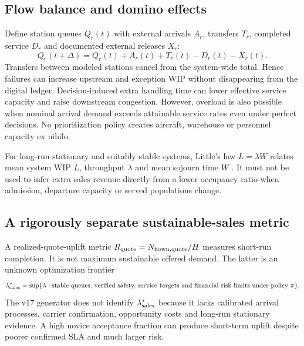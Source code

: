 \documentclass[10pt,a4paper]{article}
\theoremstyle{definition}\newtheorem{definition}[theorem]{Definition}
\theoremstyle{remark}\newtheorem{remark}[theorem]{Remark}
\newcommand{\1}{\mathbbm 1}
\begin{document}
\subsection{Flow balance and domino effects}
Define station queues $Q_r(t)$ with external arrivals $A_r$, transfers $T_r$, completed service $D_r$ and documented external releases $X_r$:
\begin{equation}\label{eq:queue}Q_r(t+\Delta)=Q_r(t)+A_r(t)+T_r(t)-D_r(t)-X_r(t).\end{equation}
Transfers between modeled stations cancel from the system-wide total. Hence failures can increase upstream and exception WIP without disappearing from the digital ledger. Decision-induced extra handling time can lower effective service capacity and raise downstream congestion. However, overload is also possible when nominal arrival demand exceeds attainable service rates even under perfect decisions. No prioritization policy creates aircraft, warehouse or personnel capacity ex nihilo.

For long-run stationary and suitably stable systems, Little's law $L=\lambda W$ relates mean system WIP $L$, throughput $\lambda$ and mean sojourn time $W$ \cite{little}. It must not be used to infer extra sales revenue directly from a lower occupancy ratio when admission, departure capacity or served populations change.

\subsection{A rigorously separate sustainable-sales metric}
A realized-quote-uplift metric $R_{\rm quote}=N_{\rm flown,quote}/H$ measures short-run completion. It is not maximum sustainable offered demand. The latter is an unknown optimization frontier
\begin{equation}\lambda^*_{\rm sales}=\sup\{\lambda:\text{stable queues, verified safety, service targets and financial risk limits under policy }\pi\}.
\end{equation}
The v17 generator does not identify $\lambda^*_{\rm sales}$ because it lacks calibrated arrival processes, carrier confirmation, opportunity costs and long-run stationary evidence. A high novice acceptance fraction can produce short-term uplift despite poorer confirmed SLA and much larger risk.
\end{document}
